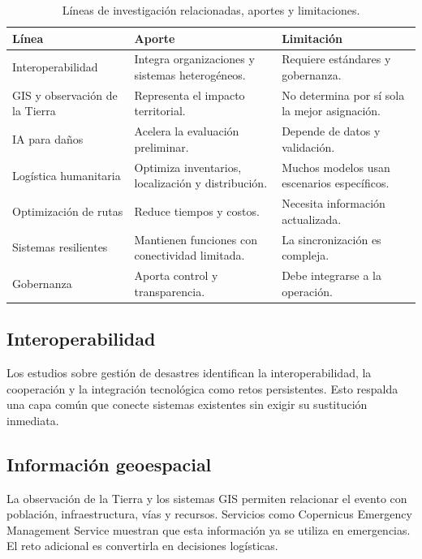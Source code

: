 \documentclass[11pt,a4paper]{article}
\begin{document}
\begin{table}[htbp]
\centering
\caption{Líneas de investigación relacionadas, aportes y limitaciones.}
\label{tab:estado-arte}
\begin{tabularx}{\textwidth}{@{}p{3.4cm}LL@{}}
\toprule
\textbf{Línea} & \textbf{Aporte} & \textbf{Limitación} \\
\midrule
Interoperabilidad & Integra organizaciones y sistemas heterogéneos. &
Requiere estándares y gobernanza. \\
\addlinespace
GIS y observación de la Tierra & Representa el impacto territorial. &
No determina por sí sola la mejor asignación. \\
\addlinespace
IA para daños & Acelera la evaluación preliminar. &
Depende de datos y validación. \\
\addlinespace
Logística humanitaria & Optimiza inventarios, localización y distribución. &
Muchos modelos usan escenarios específicos. \\
\addlinespace
Optimización de rutas & Reduce tiempos y costos. &
Necesita información actualizada. \\
\addlinespace
Sistemas resilientes & Mantienen funciones con conectividad limitada. &
La sincronización es compleja. \\
\addlinespace
Gobernanza & Aporta control y transparencia. &
Debe integrarse a la operación. \\
\bottomrule
\end{tabularx}
\end{table}

\subsection{Interoperabilidad}

Los estudios sobre gestión de desastres identifican la interoperabilidad, la
cooperación y la integración tecnológica como retos persistentes. Esto
respalda una capa común que conecte sistemas existentes sin exigir su
sustitución inmediata.

\subsection{Información geoespacial}

La observación de la Tierra y los sistemas GIS permiten relacionar el evento
con población, infraestructura, vías y recursos. Servicios como Copernicus
Emergency Management Service muestran que esta información ya se utiliza en
emergencias. El reto adicional es convertirla en decisiones logísticas.
\end{document}
